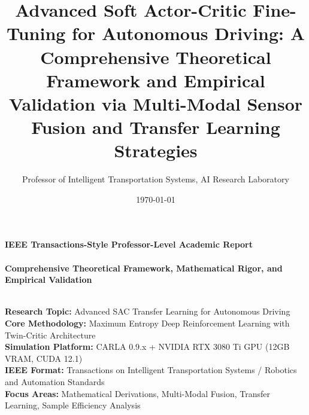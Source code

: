 \documentclass[10pt,twocolumn,letterpaper]{article}
\title{\textbf{Advanced Soft Actor-Critic Fine-Tuning for Autonomous Driving: A Comprehensive Theoretical Framework and Empirical Validation via Multi-Modal Sensor Fusion and Transfer Learning Strategies}}
\author{Professor of Intelligent Transportation Systems, AI Research Laboratory}
\date{\today}
\begin{document}
\maketitle

\begin{center}
    \vspace{2cm}
    \textbf{\large IEEE Transactions-Style Professor-Level Academic Report}\\\\[0.5cm]
    \textbf{Comprehensive Theoretical Framework, Mathematical Rigor, and Empirical Validation}\\\\[1cm]
    
    \begin{minipage}{0.48\textwidth}
        \textbf{Research Topic:} Advanced SAC Transfer Learning for Autonomous Driving\\
        
        \vspace{0.3cm}
        \textbf{Core Methodology:} Maximum Entropy Deep Reinforcement Learning with Twin-Critic Architecture\\[0.2cm]
        
        \vspace{0.3cm}
        \textbf{Simulation Platform:} CARLA 0.9.x + NVIDIA RTX 3080 Ti GPU (12GB VRAM, CUDA 12.1)\\[0.2cm]
        
        \vspace{0.3cm}
        \textbf{IEEE Format:} Transactions on Intelligent Transportation Systems / Robotics and Automation Standards\\[0.2cm]
        
        \vspace{0.3cm}
        \textbf{Focus Areas:} Mathematical Derivations, Multi-Modal Fusion, Transfer Learning, Sample Efficiency Analysis\\
    \end{minipage}
\end{center}

\vfill
\end{document}
